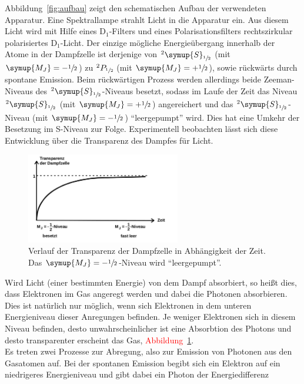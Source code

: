 Abbildung~\ref{fig:aufbau} zeigt den schematischen Aufbau der verwendeten
Apparatur. Eine Spektrallampe strahlt Licht in die Apparatur ein. Aus diesem
Licht wird mit Hilfe eines $\text{D}_1$-Filters und eines Polarisationsfilters
rechtszirkular polarisiertes $\text{D}_1$-Licht. Der einzige mögliche
Energieübergang innerhalb der Atome in der Dampfzelle ist derjenige von
$^2\symup{S}_{\sfrac{1}{2}}$ (mit $\symup{M_J}=-\sfrac{1}{2}$) zu
$^2P_{\sfrac{1}{2}}$ (mit $\symup{M_J}=+\sfrac{1}{2}$), sowie rückwärts durch
spontane Emission. Beim rückwärtigen Prozess werden allerdings beide
Zeeman-Niveaus des $^2\symup{S}_{\sfrac{1}{2}}$-Niveaus besetzt, sodass im
Laufe der Zeit das Niveau $^2\symup{S}_{\sfrac{1}{2}}$ (mit
$\symup{M_J}=+\sfrac{1}{2}$) angereichert und das
$^2\symup{S}_{\sfrac{1}{2}}$-Niveau (mit $\symup{M_J}=-\sfrac{1}{2}$)
\enquote{leergepumpt} wird. Dies hat eine Umkehr der Besetzung im S-Niveau zur
Folge. Experimentell beobachten lässt sich diese Entwicklung über die
Transparenz des Dampfes für Licht. \\
%
\begin{figure}[htb]
  \centering
  \includegraphics[width=0.6\textwidth]{figures/transparenz.pdf}
  \caption{Verlauf der Transparenz der Dampfzelle in Abhängigkeit der Zeit. Das $\symup{M_J}=-\sfrac{1}{2}$-Niveau wird \enquote{leergepumpt}\cite{V21}.}
  \label{fig:transparenz}
\end{figure}
%
Wird Licht (einer bestimmten Energie) von dem Dampf absorbiert, so heißt dies,
dass Elektronen im Gas angeregt werden und dabei die Photonen absorbieren. Dies
ist natürlich nur möglich, wenn sich Elektronen in dem unteren Energieniveau
dieser Anregungen befinden. Je weniger Elektronen sich in diesem Niveau
befinden, desto unwahrscheinlicher ist eine Absorbtion des Photons und desto
transparenter erscheint das Gas, \textcolor{red}{Abbildung~\ref{fig:transparenz}}. \\
Es treten zwei Prozesse zur Abregung, also zur Emission von Photonen aus den
Gasatomen auf. Bei der spontanen Emission begibt sich ein Elektron auf
ein niedrigeres Energieniveau und gibt dabei ein Photon der Energiedifferenz
